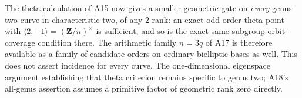 The theta calculation of A15 now gives a smaller geometric
gate on \emph{every} genus-two curve in characteristic two,
of any $2$-rank: an exact odd-order theta point with
$\langle2,-1\rangle=(\mathbf Z/n)^\times$ is sufficient,
and so is the exact same-subgroup orbit-coverage condition
there.  The arithmetic family $n=3q$ of A17 is therefore
available as a family of candidate orders on ordinary
bielliptic bases as well.
This does not assert incidence for every curve.  The
one-dimensional eigenspace argument establishing that
theta criterion remains specific to genus two; A18's
all-genus assertion assumes a primitive factor of geometric
rank zero directly.

